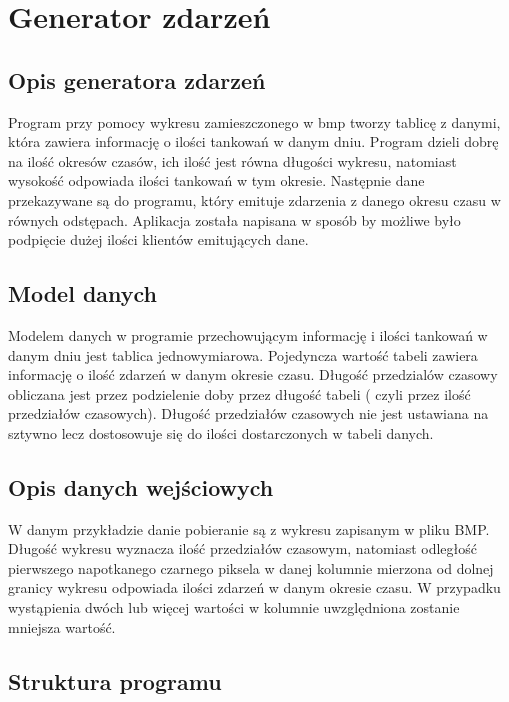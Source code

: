 \newpage
\section{Generator zdarzeń}
\label{sec:eventgenerator}

\subsection{Opis generatora zdarzeń}
\label{sec:eventgenerator-intro}

Program przy pomocy wykresu zamieszczonego w bmp tworzy tablicę z danymi, która zawiera informację o ilości tankowań w danym dniu. Program dzieli dobrę na ilość okresów czasów, ich ilość jest równa długości wykresu, natomiast wysokość odpowiada ilości tankowań w tym okresie. Następnie dane przekazywane są do programu, który emituje zdarzenia z danego okresu czasu w równych odstępach. Aplikacja została napisana w sposób by możliwe było podpięcie dużej ilości klientów emitujących dane. 

\subsection{Model danych}

Modelem danych w programie przechowującym informację i ilości tankowań w danym dniu jest tablica jednowymiarowa. Pojedyncza wartość tabeli zawiera informację o ilość zdarzeń w danym okresie czasu. Długość przedzialów czasowy obliczana jest przez podzielenie doby przez długość tabeli ( czyli przez ilość przedziałów czasowych). Długość przedziałów czasowych nie jest ustawiana na sztywno lecz dostosowuje się do ilości dostarczonych w tabeli danych. 

\subsection{Opis danych wejściowych}

W danym przykładzie danie pobieranie są z wykresu zapisanym w pliku BMP. Długość wykresu wyznacza ilość przedziałów czasowym, natomiast odległość pierwszego napotkanego czarnego piksela w danej kolumnie mierzona od dolnej granicy wykresu odpowiada  ilości zdarzeń w danym okresie czasu. W przypadku wystąpienia dwóch lub więcej wartości w kolumnie uwzględniona zostanie mniejsza wartość.

\subsection{Struktura programu}
